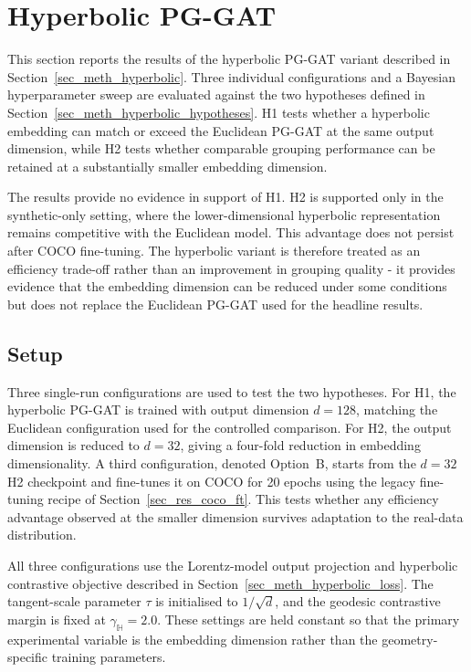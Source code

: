 \section{Hyperbolic PG-GAT}
\label{sec_res_hyperbolic}

This section reports the results of the hyperbolic PG-GAT variant
described in Section~\ref{sec_meth_hyperbolic}.
Three individual configurations and a Bayesian hyperparameter sweep
are evaluated against the two hypotheses defined in
Section~\ref{sec_meth_hyperbolic_hypotheses}.
H1 tests whether a hyperbolic embedding can match or exceed
the Euclidean PG-GAT at the same output dimension,
while H2 tests whether comparable grouping performance can be retained
at a substantially smaller embedding dimension.

The results provide no evidence in support of H1.
H2 is supported only in the synthetic-only setting,
where the lower-dimensional hyperbolic representation remains competitive
with the Euclidean model.
This advantage does not persist after COCO fine-tuning.
The hyperbolic variant is therefore treated as an efficiency trade-off
rather than an improvement in grouping quality -
it provides evidence that the embedding dimension can be reduced
under some conditions
but does not replace the Euclidean PG-GAT used for the headline results.

\subsection{Setup}
\label{sec_res_hyperbolic_setup}

Three single-run configurations are used to test the two hypotheses.
For H1, the hyperbolic PG-GAT is trained with output dimension
$d=128$,
matching the Euclidean configuration used for the controlled comparison.
For H2, the output dimension is reduced to $d=32$,
giving a four-fold reduction in embedding dimensionality.
A third configuration, denoted Option~B,
starts from the $d=32$ H2 checkpoint and fine-tunes it on COCO
for 20 epochs using the legacy fine-tuning recipe of
Section~\ref{sec_res_coco_ft}.
This tests whether any efficiency advantage observed at the smaller
dimension survives adaptation to the real-data distribution.

All three configurations use the Lorentz-model output projection
and hyperbolic contrastive objective described in
Section~\ref{sec_meth_hyperbolic_loss}.
The tangent-scale parameter $\tau$ is initialised to $1/\sqrt{d}$,
and the geodesic contrastive margin is fixed at $\gamma_{\mathbb{H}}=2.0$.
These settings are held constant so that the primary experimental
variable is the embedding dimension
rather than the geometry-specific training parameters.


